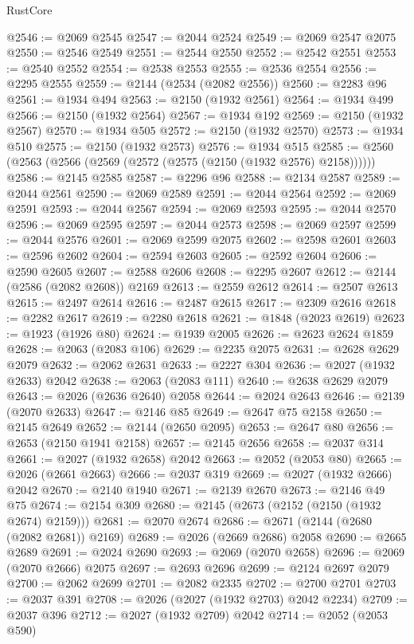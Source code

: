 \begin{lexlean}{RustCore}
\begin{coremodule}
@2546 := @2069 @2545
@2547 := @2044 @2524
@2549 := @2069 @2547 @2075
@2550 := @2546 @2549
@2551 := @2544 @2550
@2552 := @2542 @2551
@2553 := @2540 @2552
@2554 := @2538 @2553
@2555 := @2536 @2554
@2556 := @2295 @2555
@2559 := @2144 (@2534 (@2082 @2556))
@2560 := @2283 @96
@2561 := @1934 @494
@2563 := @2150 (@1932 @2561)
@2564 := @1934 @499
@2566 := @2150 (@1932 @2564)
@2567 := @1934 @192
@2569 := @2150 (@1932 @2567)
@2570 := @1934 @505
@2572 := @2150 (@1932 @2570)
@2573 := @1934 @510
@2575 := @2150 (@1932 @2573)
@2576 := @1934 @515
@2585 := @2560 (@2563 (@2566 (@2569 (@2572 (@2575 (@2150 (@1932 @2576) @2158))))))
@2586 := @2145 @2585
@2587 := @2296 @96
@2588 := @2134 @2587
@2589 := @2044 @2561
@2590 := @2069 @2589
@2591 := @2044 @2564
@2592 := @2069 @2591
@2593 := @2044 @2567
@2594 := @2069 @2593
@2595 := @2044 @2570
@2596 := @2069 @2595
@2597 := @2044 @2573
@2598 := @2069 @2597
@2599 := @2044 @2576
@2601 := @2069 @2599 @2075
@2602 := @2598 @2601
@2603 := @2596 @2602
@2604 := @2594 @2603
@2605 := @2592 @2604
@2606 := @2590 @2605
@2607 := @2588 @2606
@2608 := @2295 @2607
@2612 := @2144 (@2586 (@2082 @2608)) @2169
@2613 := @2559 @2612
@2614 := @2507 @2613
@2615 := @2497 @2614
@2616 := @2487 @2615
@2617 := @2309 @2616
@2618 := @2282 @2617
@2619 := @2280 @2618
@2621 := @1848 (@2023 @2619)
@2623 := @1923 (@1926 @80)
@2624 := @1939 @2005
@2626 := @2623 @2624 @1859
@2628 := @2063 (@2083 @106)
@2629 := @2235 @2075
@2631 := @2628 @2629 @2079
@2632 := @2062 @2631
@2633 := @2227 @304
@2636 := @2027 (@1932 @2633) @2042
@2638 := @2063 (@2083 @111)
@2640 := @2638 @2629 @2079
@2643 := @2026 (@2636 @2640) @2058
@2644 := @2024 @2643
@2646 := @2139 (@2070 @2633)
@2647 := @2146 @85
@2649 := @2647 @75 @2158
@2650 := @2145 @2649
@2652 := @2144 (@2650 @2095)
@2653 := @2647 @80
@2656 := @2653 (@2150 @1941 @2158)
@2657 := @2145 @2656
@2658 := @2037 @314
@2661 := @2027 (@1932 @2658) @2042
@2663 := @2052 (@2053 @80)
@2665 := @2026 (@2661 @2663)
@2666 := @2037 @319
@2669 := @2027 (@1932 @2666) @2042
@2670 := @2140 @1940
@2671 := @2139 @2670
@2673 := @2146 @49 @75
@2674 := @2154 @309
@2680 := @2145 (@2673 (@2152 (@2150 (@1932 @2674) @2159)))
@2681 := @2070 @2674
@2686 := @2671 (@2144 (@2680 (@2082 @2681)) @2169)
@2689 := @2026 (@2669 @2686) @2058
@2690 := @2665 @2689
@2691 := @2024 @2690
@2693 := @2069 (@2070 @2658)
@2696 := @2069 (@2070 @2666) @2075
@2697 := @2693 @2696
@2699 := @2124 @2697 @2079
@2700 := @2062 @2699
@2701 := @2082 @2335
@2702 := @2700 @2701
@2703 := @2037 @391
@2708 := @2026 (@2027 (@1932 @2703) @2042 @2234)
@2709 := @2037 @396
@2712 := @2027 (@1932 @2709) @2042
@2714 := @2052 (@2053 @590)

\end{coremodule}
\end{lexlean}
